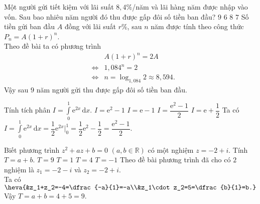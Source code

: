 \begin{ex}%
	Một người gửi tiết kiệm với lãi suất $8{,}4\%$/năm và lãi hàng năm được nhập vào vốn. Sau bao nhiêu năm người đó thu được gấp đôi số tiền ban đầu?
	\choice
	{\True $9$}
	{$6$}
	{$8$}
	{$7$}
	\loigiai
	{
		Số tiền gửi ban đầu $A$ đồng với lãi suất $r$\%, sau $n$ năm được tính theo công thức $P_n=A(1+r)^n$.\\
		Theo đề bài ta có phương trình
		\begin{eqnarray*}
			& & A(1+r)^n=2A\\
			& \Leftrightarrow & 1{,}084^n=2\\
			& \Leftrightarrow & n=\log_{1{,}084} 2\approx 8{,}594.
		\end{eqnarray*}
	Vậy sau $9$ năm người gửi thu được gấp đôi số tiền ban đầu.
	}
\end{ex}

\begin{ex}%
	Tính tích phân $I=\displaystyle\int\limits_0^1 \mathrm{e}^{2x}\mathrm{\,d}x$.
	\choice
	{$I=\mathrm{e}^2-1$}
	{$I=\mathrm{e}-1$}
	{\True $I=\dfrac{\mathrm{e}^2-1}{2}$}
	{$I=\mathrm{e}+\dfrac{1}{2}$}
	\loigiai
	{
		Ta có $I=\displaystyle\int\limits_0^1 \mathrm{e}^{2x}\mathrm{\,d}x=\dfrac{1}{2}\mathrm{e}^{2x}\bigg|_0^1=\dfrac{1}{2}\mathrm{e}^2-\dfrac{1}{2}=\dfrac{\mathrm{e}^2-1}{2}$.
	}
\end{ex}

\begin{ex}%
	Biết phương trình $z^2+az+b=0$ $(a,b \in \mathbb{R})$ có một nghiệm $z=-2+i$. Tính $T=a+b$.
	\choice
	{\True $T=9$}
	{$T=1$}
	{$T=4$}
	{$T=-1$}
	\loigiai
	{
		Theo đề bài phương trình đã cho có $2$ nghiệm là $z_1=-2-i$ và $z_2=-2+i$.\\
		Ta có $\heva{&z_1+z_2=-4=\dfrac{-a}{1}=-a\\&z_1\cdot z_2=5=\dfrac{b}{1}=b.}$\\
		Vậy $T=a+b=4+5=9$.
	}
\end{ex}

